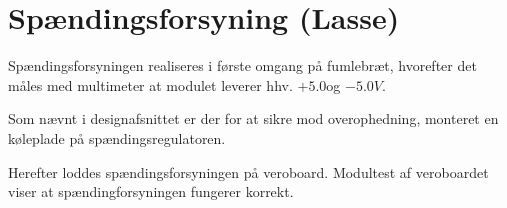 \section{Spændingsforsyning (Lasse)}

Spændingsforsyningen realiseres i første omgang på fumlebræt, hvorefter det måles med multimeter at modulet leverer hhv. $+5.0$og $-5.0V$.

Som nævnt i designafsnittet er der for at sikre mod overophedning, monteret en køleplade på spændingsregulatoren. 

Herefter loddes spændingsforsyningen på veroboard. Modultest af veroboardet viser at spændingforsyningen fungerer korrekt.

